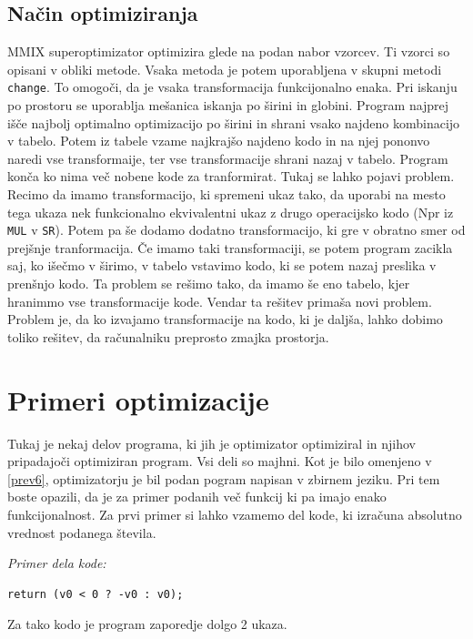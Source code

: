 \documentclass[a4paper, 12pt]{book}
\begin{document}
\subsection{Način optimiziranja}

MMIX superoptimizator optimizira glede na podan nabor vzorcev. Ti vzorci so opisani v obliki metode. Vsaka metoda je potem uporabljena v skupni metodi \texttt{change}. To omogoči, da je vsaka transformacija funkcijonalno enaka. Pri iskanju po prostoru se uporablja mešanica iskanja po širini in globini. Program najprej išče najbolj optimalno optimizacijo po širini in shrani vsako najdeno kombinacijo v tabelo. Potem iz tabele vzame najkrajšo najdeno kodo in na njej pononvo naredi vse transformaije, ter vse transformacije shrani nazaj v tabelo. Program konča ko nima več nobene kode za tranformirat. Tukaj se lahko pojavi problem. Recimo da imamo transformacijo, ki spremeni ukaz tako, da uporabi na mesto tega ukaza nek funkcionalno ekvivalentni ukaz z drugo operacijsko kodo (Npr iz \texttt{MUL} v \texttt{SR}). Potem pa še dodamo dodatno transformacijo, ki gre v obratno smer od prejšnje tranformacija. Če imamo taki transformaciji, se potem program zacikla saj, ko išečmo v širimo, v tabelo vstavimo kodo, ki se potem nazaj preslika v prenšnjo kodo. Ta problem se rešimo tako, da imamo še eno tabelo, kjer hranimmo vse transformacije kode. Vendar ta rešitev primaša novi problem. Problem je, da ko izvajamo transformacije na kodo, ki je daljša, lahko dobimo toliko rešitev, da računalniku preprosto zmajka prostorja.

\section{Primeri optimizacije}
\label{priG}
Tukaj je nekaj delov programa, ki jih je optimizator optimiziral in njihov pripadajoči optimiziran program. Vsi deli so majhni. Kot je bilo omenjeno v \ref{prev6}, optimizatorju je bil podan pogram napisan v zbirnem jeziku. Pri tem boste opazili, da je za primer podanih več funkcij ki pa imajo enako funkcijonalnost. Za prvi primer si lahko vzamemo del kode, ki izračuna absolutno vrednost podanega števila.

\medskip

\noindent
{\it Primer dela kode:}
\begin{Verbatim}[baselinestretch=1]
return (v0 < 0 ? -v0 : v0);
\end{Verbatim}

Za tako kodo je program zaporedje dolgo 2 ukaza.
\end{document}
